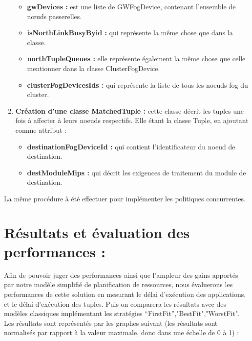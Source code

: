 \begin{enumerate}
\begin{itemize}
     \item \textbf{gwDevices :} est une liste de GWFogDevice, contenant l'ensemble de nœuds passerelles.
     \item \textbf{isNorthLinkBusyByid :} qui représente la même chose que dans la classe.
     \item \textbf{northTupleQueues :} elle représente également la même chose que celle mentionner dans la classe ClusterFogDevice.
     \item \textbf{clusterFogDevicesIds :} qui représente la liste de tous les noeuds fog du cluster.
     \end{itemize}
     \item \textbf{Création d’une classe MatchedTuple :} cette classe décrit  les tuples une fois à affecter à leurs noeuds respectifs. Elle étant la classe Tuple, en ajoutant comme attribut :
     \begin{itemize}
         \item \textbf{destinationFogDeviceId :} qui contient l’identificateur du noeud de destination.
         \item \textbf{destModuleMips :} qui décrit les exigences de traitement du module de destination.
     \end{itemize}
\end{enumerate}
La même procédure à été effectuer pour implémenter les politiques concurrentes. 
\section{Résultats et évaluation des performances :}
Afin de pouvoir juger des performances ainsi que l’ampleur des gains apportés par notre modèle simplifié de planification de ressources,  nous évaluerons les performances de cette solution en mesurant le délai d'exécution des applications, et le délai d'exécution des tuples. Puis on comparera les résultats avec des modèles classiques implémentant les stratégies “FirstFit”,"BestFit","WorstFit".
Les résultats sont représentés par les graphes suivant (les résultats sont normalisés par rapport à la valeur maximale, donc dans une échelle de 0 à 1) :


